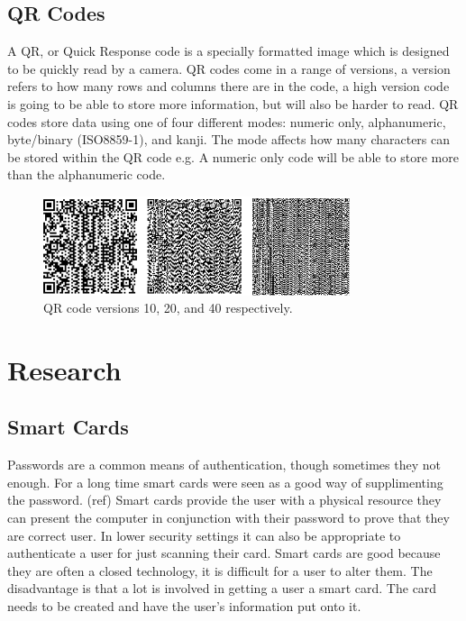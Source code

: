 \documentclass[]{report}   %
\begin{document}
\subsection{QR Codes}
A QR, or Quick Response code \cite{QR} is a specially formatted image which is designed to be quickly read by a camera. QR codes come in a range of versions, a version refers to how many rows and columns there are in the code, a high version code is going to be able to store more information, but will also be harder to read. QR codes store data using one of four different modes: numeric only, alphanumeric, byte/binary (ISO8859-1), and kanji. The mode affects how many characters can be stored within the QR code e.g. A numeric only code will be able to store more than the alphanumeric code.

\begin{figure}[H]
\centering
\includegraphics[width=9cm]{QRCodes.png}
\caption{QR code versions 10, 20, and 40 respectively.}
\end{figure}

\section{Research}
\subsection{Smart Cards}
Passwords are a common means of authentication, though sometimes they not enough. For a long time smart cards were seen as a good way of supplimenting the password. (ref)  Smart cards provide the user with a physical resource they can present the computer in conjunction with their password to prove that they are correct user. In lower security settings it can also be appropriate to authenticate a user for just scanning their card. Smart cards are good because they are often a closed technology, it is difficult for a user to alter them. The disadvantage is that a lot is involved in getting a user a smart card. The card needs to be created and have the user's information put onto it.
\end{document}
